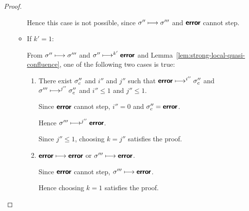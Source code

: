 \begin{proof}
\begin{enumerate}
\begin{itemize}
        Hence this case is not possible, since $\sigma'' \longmapsto
        \sigma'''$ and $\textbf{\textsf{error}}$ cannot step.

      \item If $k' = 1$:

        From $\sigma'' \longmapsto \sigma'''$ and $\sigma''
        \longmapsto^{k'} \textbf{\textsf{error}}$ and
        Lemma~\ref{lem:strong-local-quasi-confluence}, one of the
        following two cases is true:

        \begin{enumerate}
        \item There exist $\sigma_c''$ and $i''$ and $j''$ such that
          $\textbf{\textsf{error}} \longmapsto^{i''} \sigma_c''$ and $\sigma'''
          \longmapsto^{j''} \sigma_c''$ and $i'' \leq 1$ and $j''
          \leq 1$.

          Since $\textbf{\textsf{error}}$ cannot step, $i'' = 0$ and $\sigma''_c =
          \textbf{\textsf{error}}$.

          Hence $\sigma''' \longmapsto^{j''} \textbf{\textsf{error}}$.


          Since $j'' \leq 1$, choosing $k = j''$ satisfies the proof.

        \item $\textbf{\textsf{error}} \longmapsto \textbf{\textsf{error}}$ or $\sigma''' \longmapsto
          \textbf{\textsf{error}}$.

          Since $\textbf{\textsf{error}}$ cannot step, $\sigma''' \longmapsto \textbf{\textsf{error}}$.

          Hence choosing $k = 1$ satisfies the proof.

        \end{enumerate}

      \end{itemize}

  \end{enumerate}

\end{proof}
